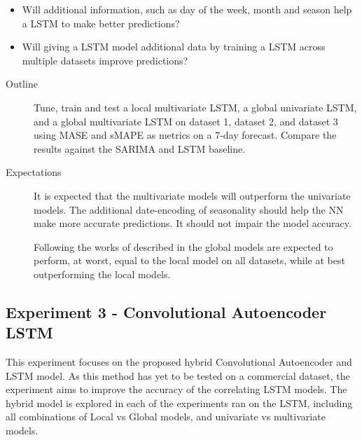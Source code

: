 \begin{itemize}
  \item {Will additional information, such as day of the week, month and season help a LSTM to make better predictions?}
  \item {Will giving a LSTM model additional data by training a LSTM across multiple datasets improve predictions?}
\end{itemize}

\begin{description}
  \item[Outline]{
              Tune, train and test a local multivariate LSTM, a global univariate LSTM,
              and a global multivariate LSTM on dataset 1,
              dataset 2, and dataset 3 using MASE and sMAPE as metrics on a 7-day forecast.
              Compare the results against the SARIMA and LSTM baseline.
        }
\end{description}

\begin{description}
  \item[Expectations]{
              It is expected that the multivariate models will outperform the univariate models.
              The additional date-encoding of seasonality should help the NN make more accurate predictions.
              It should not impair the model accuracy.

              Following the works of \cite{Montero-Manso2021} described in 
              the global models are expected to perform, at worst, equal to the local model on all datasets, while at best outperforming the local models.

        }
\end{description}

\subsection{Experiment 3 - Convolutional Autoencoder LSTM}
This experiment focuses on the proposed hybrid Convolutional Autoencoder and LSTM model.
As this method has yet to be tested on a commercial dataset,
the experiment aims to improve the accuracy of the correlating LSTM models.
The hybrid model is explored in each of the experiments ran on the LSTM,
including all combinations of Local vs Global models, and univariate vs multivariate models.

